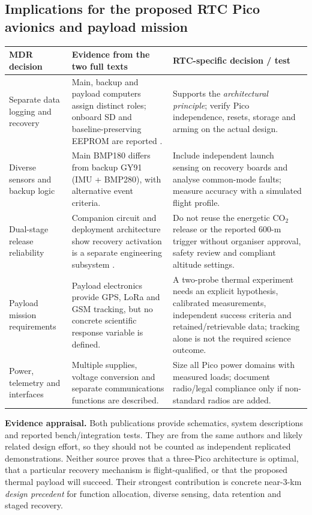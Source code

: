 \documentclass[10pt,a4paper]{article}
\begin{document}
\subsection{Implications for the proposed RTC Pico avionics and payload mission}
\begin{center}\small
\begin{tabularx}{\linewidth}{@{}L{35mm}Y L{41mm}@{}}
\toprule{}\textbf{MDR decision} & \textbf{Evidence from the two full texts} & \textbf{RTC-specific decision / test}\\\midrule
Separate data logging and recovery & Main, backup and payload computers assign distinct roles; onboard SD and baseline-preserving EEPROM are reported \cite{bakirci2022}. & Supports the \emph{architectural principle}; verify Pico independence, resets, storage and arming on the actual design.\\
Diverse sensors and backup logic & Main BMP180 differs from backup GY91 (IMU + BMP280), with alternative event criteria. & Include independent launch sensing on recovery boards and analyse common-mode faults; measure accuracy with a simulated flight profile.\\
Dual-stage release reliability & Companion circuit and deployment architecture show recovery activation is a separate engineering subsystem \cite{bakirci2022recovery}. & Do not reuse the energetic CO$_2$ release or the reported 600-m trigger without organiser approval, safety review and compliant altitude settings.\\
Payload mission requirements & Payload electronics provide GPS, LoRa and GSM tracking, but no concrete scientific response variable is defined. & A two-probe thermal experiment needs an explicit hypothesis, calibrated measurements, independent success criteria and retained/retrievable data; tracking alone is not the required science outcome.\\
Power, telemetry and interfaces & Multiple supplies, voltage conversion and separate communications functions are described. & Size all Pico power domains with measured loads; document radio/legal compliance only if non-standard radios are added.\\
\bottomrule
\end{tabularx}
\end{center}

\textbf{Evidence appraisal.} Both publications provide schematics, system descriptions and reported bench/integration tests. They are from the same authors and likely related design effort, so they should not be counted as independent replicated demonstrations. Neither source proves that a three-Pico architecture is optimal, that a particular recovery mechanism is flight-qualified, or that the proposed thermal payload will succeed. Their strongest contribution is concrete near-3-km \emph{design precedent} for function allocation, diverse sensing, data retention and staged recovery.
\end{document}

